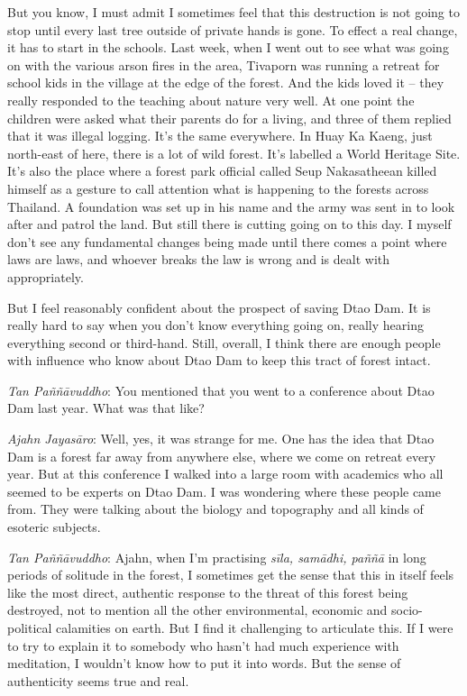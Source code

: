 But you know, I must admit I sometimes feel that this destruction is not
going to stop until every last tree outside of private hands is gone. To
effect a real change, it has to start in the schools. Last week, when I
went out to see what was going on with the various arson fires in the
area, Tivaporn was running a retreat for school kids in the village at
the edge of the forest. And the kids loved it -- they really responded
to the teaching about nature very well. At one point the children were
asked what their parents do for a living, and three of them replied that
it was illegal logging. It's the same everywhere. In Huay Ka Kaeng, just
north-east of here, there is a lot of wild forest. It's labelled a World
Heritage Site. It's also the place where a forest park official called
Seup Nakasatheean killed himself as a gesture to call attention what is
happening to the forests across Thailand. A foundation was set up in his
name and the army was sent in to look after and patrol the land. But
still there is cutting going on to this day. I myself don't see any
fundamental changes being made until there comes a point where laws are
laws, and whoever breaks the law is wrong and is dealt with
appropriately. 

But I feel reasonably confident about the prospect of saving Dtao Dam. 
It is really hard to say when you don't know everything going on, really
hearing everything second or third-hand. Still, overall, I think there
are enough people with influence who know about Dtao Dam to keep this
tract of forest intact. 

\emph{Tan Paññāvuddho}: You mentioned that you went to a conference
about Dtao Dam last year. What was that like? 

\emph{Ajahn Jayasāro}: Well, yes, it was strange for me. One has the
idea that Dtao Dam is a forest far away from anywhere else, where we
come on retreat every year. But at this conference I walked into a large
room with academics who all seemed to be experts on Dtao Dam. I was
wondering where these people came from. They were talking about the
biology and topography and all kinds of esoteric subjects. 

\emph{Tan Paññāvuddho}: Ajahn, when I'm practising \emph{sīla, samādhi, 
paññā} in long periods of solitude in the forest, I sometimes get the
sense that this in itself feels like the most direct, authentic response
to the threat of this forest being destroyed, not to mention all the
other environmental, economic and socio-political calamities on earth. 
But I find it challenging to articulate this. If I were to try to
explain it to somebody who hasn't had much experience with meditation, I
wouldn't know how to put it into words. But the sense of authenticity
seems true and real. 


